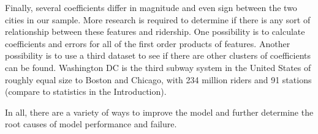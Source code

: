 \documentclass{article}
\begin{document}
Finally, several coefficients differ in magnitude and even sign between the two cities in our sample. More research is required to determine if there is any sort of relationship between these features and ridership. One possibility is to calculate coefficients and errors for all of the first order products of features. Another possibility is to use a third dataset to see if there are other clusters of coefficients can be found. Washington DC is the third subway system in the United States of roughly equal size to Boston and Chicago, with 234 million riders and 91 stations (compare to statistics in the Introduction).

In all, there are a variety of ways to improve the model and further determine the root causes of model performance and failure. 






 
\end{document}
